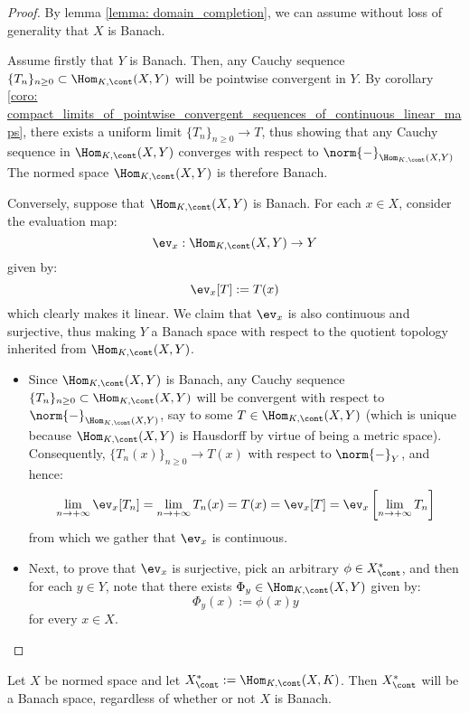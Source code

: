             \begin{proof}
                By lemma \ref{lemma: domain_completion}, we can assume without loss of generality that $X$ is Banach.
                
                Assume firstly that $Y$ is Banach. Then, any Cauchy sequence $\{T_n\}_{n \geq 0} \subset \Hom_{K, \cont}(X, Y)$ will be pointwise convergent in $Y$. By corollary \ref{coro: compact_limits_of_pointwise_convergent_sequences_of_continuous_linear_maps}, there exists a uniform limit $\{T_n\}_{n \geq 0} \to T$, thus showing that any Cauchy sequence in $\Hom_{K, \cont}(X, Y)$ converges with respect to $\norm{-}_{\Hom_{K, \cont}(X, Y)}$ The normed space $\Hom_{K, \cont}(X, Y)$ is therefore Banach.

                Conversely, suppose that $\Hom_{K, \cont}(X, Y)$ is Banach. For each $x \in X$, consider the evaluation map:
                    $$\ev_x: \Hom_{K, \cont}(X, Y) \to Y$$
                given by:
                    $$\ev_x[T] := T(x)$$
                which clearly makes it linear. We claim that $\ev_x$ is also continuous and surjective, thus making $Y$ a Banach space with respect to the quotient topology inherited from $\Hom_{K, \cont}(X, Y)$.
                \begin{itemize}
                    \item Since $\Hom_{K, \cont}(X, Y)$ is Banach, any Cauchy sequence $\{T_n\}_{n \geq 0} \subset \Hom_{K, \cont}(X, Y)$ will be convergent with respect to $\norm{-}_{\Hom_{K, \cont}(X, Y)}$, say to some $T \in \Hom_{K, \cont}(X, Y)$ (which is unique because $\Hom_{K, \cont}(X, Y)$ is Hausdorff by virtue of being a metric space). Consequently, $\{T_n(x)\}_{n \geq 0} \to T(x)$ with respect to $\norm{-}_Y$, and hence:
                        $$\lim_{n \to +\infty} \ev_x[T_n] = \lim_{n \to +\infty} T_n(x) = T(x) = \ev_x[T] = \ev_x\left[ \lim_{n \to +\infty} T_n \right]$$
                    from which we gather that $\ev_x$ is continuous.
                    \item Next, to prove that $\ev_x$ is surjective, pick an arbitrary $\phi \in X^*_{\cont}$, and then for each $y \in Y$, note that there exists $\Phi_y \in \Hom_{K, \cont}(X, Y)$ given by:
                        $$\Phi_y(x) := \phi(x) y$$
                    for every $x \in X$.
                \end{itemize}
            \end{proof}
        \begin{corollary} \label{coro: duals_of_normed_space_are_banach}
            Let $X$ be normed space and let $X^*_{\cont} := \Hom_{K, \cont}(X, K)$. Then $X^*_{\cont}$ will be a Banach space, regardless of whether or not $X$ is Banach.
        \end{corollary}
